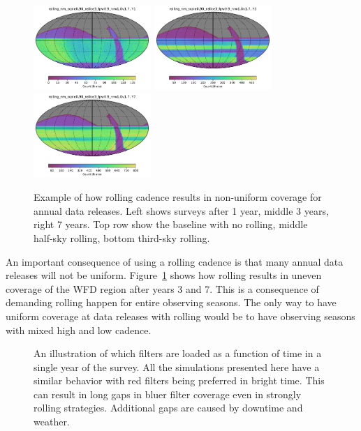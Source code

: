 \documentclass[modern]{aastex62}
\begin{document}
\begin{figure}
\includegraphics[width=1.75in]{plots/yearly_release/rolling_nm_scale0_90_nslice3_fpw0_9_nrw1_0v1_7_Count_night_lt_365_and_note_not_like_DD_HEAL_SkyMap.pdf}
\includegraphics[width=1.75in]{plots/yearly_release/rolling_nm_scale0_90_nslice3_fpw0_9_nrw1_0v1_7_Count_nightlt1095_and_note_not_like_DD_HEAL_SkyMap.pdf}
\includegraphics[width=1.75in]{plots/yearly_release/rolling_nm_scale0_90_nslice3_fpw0_9_nrw1_0v1_7_Count_night_lt_2556_and_note_not_like_DD_HEAL_SkyMap.pdf}
\caption{Example of how rolling cadence results in non-uniform coverage for annual data releases. Left shows surveys after 1 year, middle 3 years, right 7 years. Top row show the baseline with no rolling, middle half-sky rolling, bottom third-sky rolling. \label{fig:years}}
\end{figure}

An important consequence of using a rolling cadence is that many annual data releases will not be uniform. Figure~\ref{fig:years} shows how rolling results in uneven coverage of the WFD region after years 3 and 7. This is a consequence of demanding rolling happen for entire observing seasons. The only way to have uniform coverage at data releases with rolling would be to have observing seasons with mixed high and low cadence.



\begin{figure}
\caption{An illustration of which filters are loaded as a function of time in a single year of the survey. All the simulations presented here have a similar behavior with red filters being preferred in bright time. This can result in long gaps in bluer filter coverage even in strongly rolling strategies. Additional gaps are caused by downtime and weather. \label{fig:hour}}
\end{figure}
\end{document}
